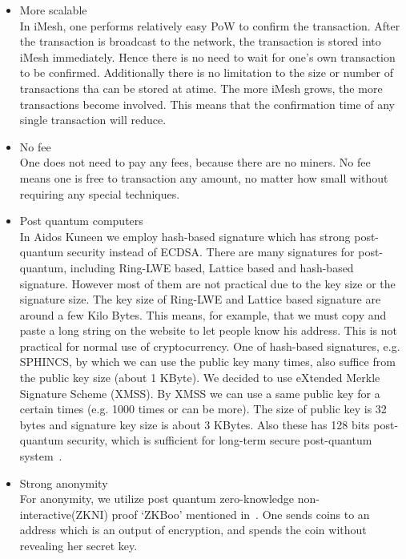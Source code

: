 \documentclass[a4paper,10pt,twocolumn]{article}
\begin{document}
\vspace{-0.5\baselineskip}
\begin{itemize}
	\setlength\itemsep{0em}
	\item{More scalable}\mbox{}\\ 
In iMesh, one performs relatively easy PoW to confirm the transaction. After the transaction is broadcast to the network, the 
transaction is stored into iMesh immediately. Hence there is no need to wait for one's own transaction to be confirmed. Additionally 
there is no limitation to the size or number of transactions tha can be stored at atime. The more iMesh grows, the more transactions 
become involved. This means that the confirmation time of any single transaction will reduce.

\item{No fee}\mbox{}\\ 
One does not need to pay any fees, because there are no miners. No fee means one is free to transaction any amount, no matter how small 
without requiring any special techniques.

\item{Post quantum computers}\mbox{}\\ 
In Aidos Kuneen we employ hash-based signature which has strong post-quantum security instead of ECDSA.
There are many signatures for post-quantum, including Ring-LWE based, Lattice based and hash-based signature.
However most of them are not practical due to the key size or the signature size.
The key size of Ring-LWE and Lattice based signature are around a few Kilo Bytes. This means, for example, that we 
must copy and paste a long string on the website to let people know his address. This is not practical for normal use of cryptocurrency.
One of hash-based signatures, e.g. SPHINCS, by which we can use the public key many times, also suffice from the public key size (about 1 KByte).
We decided to use eXtended Merkle Signature Scheme (XMSS). By XMSS we can use a same public key for a certain times (e.g. 1000 times or can be more).
The size of public key is 32 bytes and signature key size is about 3 KBytes.
Also these has 128 bits post-quantum security, which is sufficient for long-term secure post-quantum system~\cite{recom}.

\item{Strong anonymity}\mbox{}\\ 
For anonymity, we utilize post quantum zero-knowledge non-interactive(ZKNI) proof `ZKBoo' mentioned in~\cite{zkboo}.
One sends coins to an address which is an output of encryption, and spends the coin without revealing her secret key.
\end{itemize}
\end{document}
